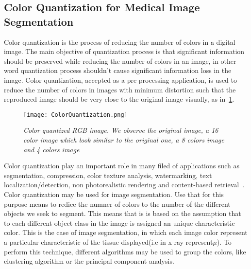\documentclass{standalone}
\begin{document}
	\subsection{Color Quantization for Medical Image Segmentation}
	

	Color quantization is the process of reducing the number of colors in a digital image. The main objective of quantization process is that 
	significant information should be preserved while reducing the number of colors in an image, in other word quantization process shouldn’t cause 
	significant information loss in the image. 
	Color quantization, accepted as a pre-processing application, is used to reduce the number of colors in images with minimum distortion such that the 
	reproduced image should be very close to the original image visually, as in \figurename\,\ref{fig:ColorQuantization}. 

	\begin{figure}[h!]
		
		\centering
			\texttt{[image: ColorQuantization.png]}
		\caption{\textit{Color quantized RGB image. We observe the original image, a 16 color image which look similar to the original one, a 8 colors image and 4 colors image}}\label{fig:ColorQuantization}
	\end{figure}

	Color quantization play an important role in many filed of applications such as segmentation, compression, color texture analysis, watermarking, 
	text localization/detection, non photorealistic rendering and content-based retrieval~\cite{ART:Ozturk}.\\
	
	
	Color quantization may be used for image segmentation. Use that for this purpose means to redice the numner of colors to the number of the different objects we seek to segment. This means that is is based on the assumption that to each different object class in the image is assigned an unique characteristic color. This is the case of image segmentation, in which each image color represent a particular characteristic of the tissue displayed(i.e in x-ray represent$\mu$). 
	To perform this technique, different algorithms may be used to group the colors, like clustering algorithm or the principal component analysis.


	
	
	
	

	
	
\end{document}
